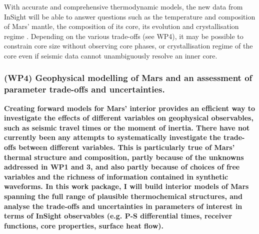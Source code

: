 \documentclass[11pt,twoside,a4paper]{article}
\begin{document}
With accurate and comprehensive thermodynamic models, the new data from InSight will be able to answer questions such as the temperature and composition of Mars' mantle, the composition of its core, its evolution and crystallisation regime \citep{SSWL2007}. Depending on the various trade-offs (see WP4), it may be possible to constrain core size without observing core phases, or crystallisation regime of the core even if seismic data cannot unambiguously resolve an inner core. 





\subsubsection*{(WP4) Geophysical modelling of Mars and an assessment of parameter trade-offs and uncertainties.}

\textbf{Creating forward models for Mars' interior provides an efficient way to investigate the effects of different variables on geophysical observables, such as seismic travel times or the moment of inertia. There have not currently been any attempts to systematically investigate the trade-offs between different variables. This is particularly true of Mars' thermal structure and composition, partly because of the unknowns addressed in WP1 and 3, and also partly because of choices of free variables and the richness of information contained in synthetic waveforms. In this work package, I will build interior models of Mars spanning the full range of plausible thermochemical structures, and analyse the trade-offs and uncertainties in parameters of interest in terms of InSight observables (e.g. P-S differential times, receiver functions, core properties, surface heat flow).}
\end{document}
